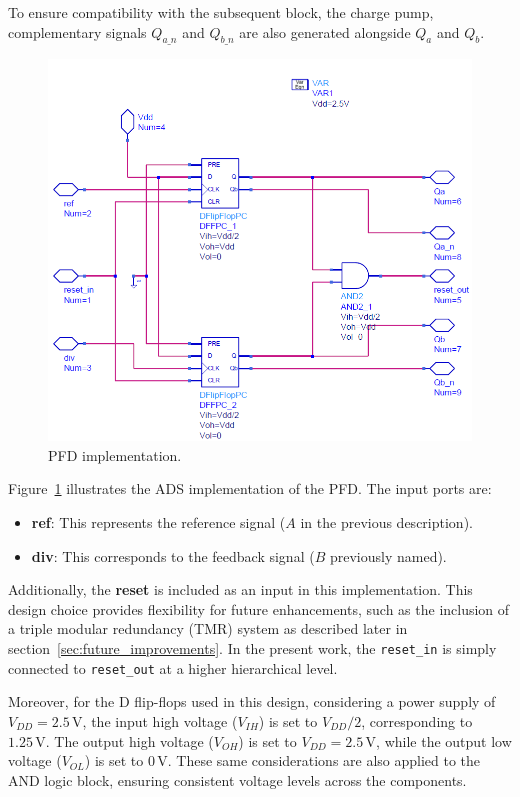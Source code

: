 \documentclass[lettersize,journal]{IEEEtran}
\begin{document}
To ensure compatibility with the subsequent block, the charge pump, complementary signals \( Q_{a\_n} \) and \( Q_{b\_n} \) are also generated alongside \( Q_a \) and \( Q_b \).

\begin{figure}[!h]
    \centering
    \includegraphics[width=1\linewidth]{images/block_design/PFD/PFD_ADS.png}
    \caption{PFD implementation.}
    \label{fig:PFD_ADS}
\end{figure}

Figure~\ref{fig:PFD_ADS} illustrates the ADS implementation of the PFD. The input ports are:
\begin{itemize}
    \item \textbf{ref}: This represents the reference signal (\( A \) in the previous description).
    \item \textbf{div}: This corresponds to the feedback signal (\( B \) previously named).
\end{itemize}

Additionally, the \textbf{reset} is included as an input in this implementation. This design choice provides flexibility for future enhancements, such as the inclusion of a triple modular redundancy (TMR) system as described later in section~\ref{sec:future_improvements}. In the present work, the \texttt{reset\_in} is simply connected to \texttt{reset\_out} at a higher hierarchical level.

Moreover, for the D flip-flops used in this design, considering a power supply of \( V_{DD} = 2.5\,\mathrm{V} \), the input high voltage (\( V_{IH} \)) is set to \( V_{DD}/2 \), corresponding to \( 1.25\,\mathrm{V} \). The output high voltage (\( V_{OH} \)) is set to \( V_{DD} = 2.5\,\mathrm{V} \), while the output low voltage (\( V_{OL} \)) is set to \( 0\,\mathrm{V} \). These same considerations are also applied to the AND logic block, ensuring consistent voltage levels across the components.
\end{document}
